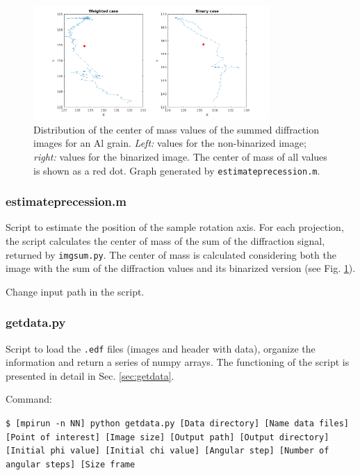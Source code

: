 \documentclass[11pt]{scrartcl}
\begin{document}
\begin{figure}[h]
    \centering
    \includegraphics[width=0.8\textwidth]{Estimate_CM.png}
    \caption{Distribution of the center of mass values of the summed diffraction images for an Al grain. {\emph{Left:}} values for the non-binarized image; {\emph{right:}} values for the binarized image. The center of mass of all values is shown as a red dot. Graph generated by {\texttt{estimate\textunderscore precession.m}}.}
    \label{fig:estimate_CM}
\end{figure}

\subsubsection{estimate\textunderscore precession.m}

Script to estimate the position of the sample rotation axis. For each projection, the script calculates the center of mass of the sum of the diffraction signal, returned by {\texttt{img\textunderscore sum.py}}. The center of mass is calculated considering both the image with the sum of the diffraction values and its binarized version (see Fig. \ref{fig:estimate_CM}).

\danger Change input path in the script.

\subsubsection{getdata.py}
\label{script:getdata}

Script to load the {\texttt{.edf}} files (images and header with data), organize the information and return a series of numpy arrays. The functioning of the script is presented in detail in Sec. \ref{sec:getdata}. 

Command:

{\texttt{\$ [mpirun -n NN] python getdata.py [Data directory] [Name data files] [Point of interest] [Image size] [Output path] [Output directory] [Initial phi value] [Initial chi value] [Angular step] [Number of angular steps] [Size frame}}
\end{document}
